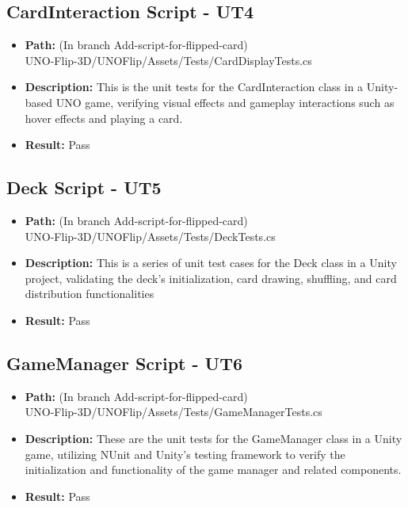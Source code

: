 \documentclass[12pt, titlepage]{article}
\begin{document}
\subsection{CardInteraction Script - UT4}
\begin{itemize}
    \item \textbf{Path:} (In branch Add-script-for-flipped-card) \\ UNO-Flip-3D/UNOFlip/Assets/Tests/CardDisplayTests.cs
    \item \textbf{Description:} This is the unit tests for the CardInteraction class in a Unity-based UNO game, verifying visual effects and gameplay interactions such as hover effects and playing a card.
    \item \textbf{Result:} Pass
\end{itemize}

\subsection{Deck Script - UT5}
\begin{itemize}
    \item \textbf{Path:} (In branch Add-script-for-flipped-card) \\ UNO-Flip-3D/UNOFlip/Assets/Tests/DeckTests.cs
    \item \textbf{Description:} This is a series of unit test cases for the Deck class in a Unity project, validating the deck's initialization, card drawing, shuffling, and card distribution functionalities 
    \item \textbf{Result:} Pass
\end{itemize}

\subsection{GameManager Script - UT6}
\begin{itemize}
    \item \textbf{Path:} (In branch Add-script-for-flipped-card) \\ UNO-Flip-3D/UNOFlip/Assets/Tests/GameManagerTests.cs
    \item \textbf{Description:} These are the unit tests for the GameManager class in a Unity game, utilizing NUnit and Unity's testing framework to verify the initialization and functionality of the game manager and related components. 
    \item \textbf{Result:} Pass
\end{itemize}
\end{document}
